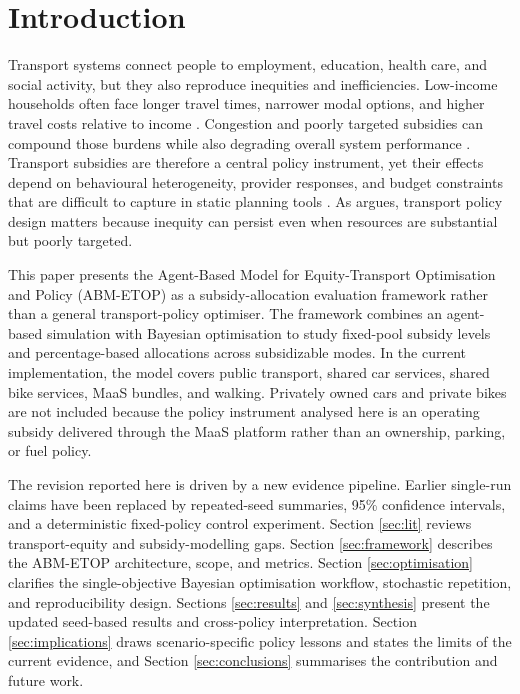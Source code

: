 \documentclass[a4paper,fleqn]{cas-sc}
\begin{document}
\maketitle

\section{Introduction}\label{sec:intro}
Transport systems connect people to employment, education, health care, and social activity, but they also reproduce inequities and inefficiencies. Low-income households often face longer travel times, narrower modal options, and higher travel costs relative to income \citep{Lucas2016, Allen2019}. Congestion and poorly targeted subsidies can compound those burdens while also degrading overall system performance \citep{AFTABUZZAMAN20101}. Transport subsidies are therefore a central policy instrument, yet their effects depend on behavioural heterogeneity, provider responses, and budget constraints that are difficult to capture in static planning tools \citep{Pereira2017, Martens2017b, ITF2024}. As \citet{Martens2016} argues, transport policy design matters because inequity can persist even when resources are substantial but poorly targeted.

This paper presents the Agent-Based Model for Equity-Transport Optimisation and Policy (ABM-ETOP) as a subsidy-allocation evaluation framework rather than a general transport-policy optimiser. The framework combines an agent-based simulation with Bayesian optimisation to study fixed-pool subsidy levels and percentage-based allocations across subsidizable modes. In the current implementation, the model covers public transport, shared car services, shared bike services, MaaS bundles, and walking. Privately owned cars and private bikes are not included because the policy instrument analysed here is an operating subsidy delivered through the MaaS platform rather than an ownership, parking, or fuel policy.

The revision reported here is driven by a new evidence pipeline. Earlier single-run claims have been replaced by repeated-seed summaries, 95\% confidence intervals, and a deterministic fixed-policy control experiment. Section \ref{sec:lit} reviews transport-equity and subsidy-modelling gaps. Section \ref{sec:framework} describes the ABM-ETOP architecture, scope, and metrics. Section \ref{sec:optimisation} clarifies the single-objective Bayesian optimisation workflow, stochastic repetition, and reproducibility design. Sections \ref{sec:results} and \ref{sec:synthesis} present the updated seed-based results and cross-policy interpretation. Section \ref{sec:implications} draws scenario-specific policy lessons and states the limits of the current evidence, and Section \ref{sec:conclusions} summarises the contribution and future work.
\end{document}
